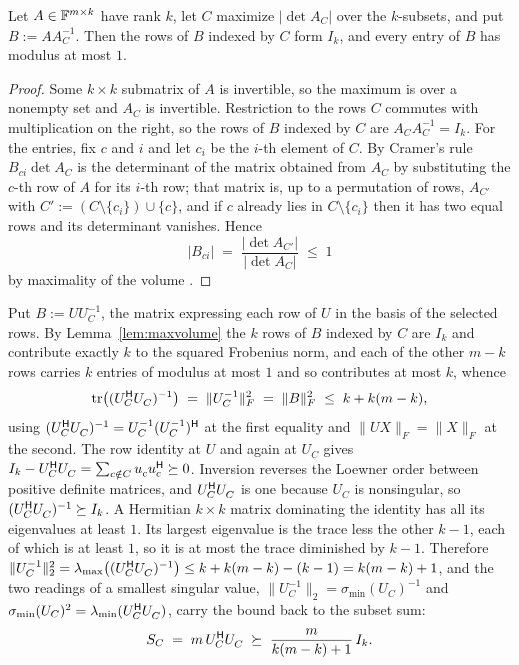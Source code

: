 \begin{lemma}\label{lem:maxvolume}
Let $A\in\mathbb{F}^{m\times k}$ have rank $k$, let $C$ maximize
$\lvert\det A_C\rvert$ over the $k$-subsets, and put $B:=AA_C^{-1}$.  Then
the rows of $B$ indexed by $C$ form $I_k$, and every entry of $B$ has
modulus at most $1$.
\end{lemma}

\begin{proof}
Some $k\times k$ submatrix of $A$ is invertible, so the maximum is over a
nonempty set and $A_C$ is invertible.  Restriction to the rows $C$
commutes with multiplication on the right, so the rows of $B$ indexed by
$C$ are $A_CA_C^{-1}=I_k$.  For the entries, fix $c$ and $i$ and let $c_i$
be the $i$-th element of $C$.  By Cramer's rule $B_{ci}\det A_C$ is the
determinant of the matrix obtained from $A_C$ by substituting the $c$-th
row of $A$ for its $i$-th row; that matrix is, up to a permutation of
rows, $A_{C'}$ with $C':=(C\setminus\{c_i\})\cup\{c\}$, and if $c$ already
lies in $C\setminus\{c_i\}$ then it has two equal rows and its determinant
vanishes.  Hence
\[
  \lvert B_{ci}\rvert
  \;=\;\frac{\lvert\det A_{C'}\rvert}{\lvert\det A_C\rvert}\;\le\;1
\]
by maximality of the volume \cite{GT2001}.
\end{proof}

Put $B:=UU_C^{-1}$, the matrix expressing each row of $U$ in the
basis of the selected rows.  By Lemma~\ref{lem:maxvolume} the $k$ rows of
$B$ indexed by $C$ are $I_k$ and contribute exactly $k$ to the squared
Frobenius norm, and each of the other $m-k$ rows carries $k$ entries of
modulus at most $1$ and so contributes at most $k$, whence
\[
  \tr\bigl((U_C\adj U_C^{\vphantom{\mathsf{H}}})^{-1}\bigr)
  \;=\;\lVert U_C^{-1}\rVert_F^2
  \;=\;\lVert B\rVert_F^2
  \;\le\;k+k(m-k),
\]
using $(U_C\adj U_C^{\vphantom{\mathsf{H}}})^{-1}=U_C^{-1}(U_C^{-1})\adj$ at
the first equality and $\lVert UX\rVert_F=\lVert X\rVert_F$ at the second.
The row identity at $U$ and again at $U_C$ gives
$I_k-U_C\adj U_C^{\vphantom{\mathsf{H}}}
=\sum_{c\notin C}u_c^{\vphantom{\mathsf{H}}}u_c\adj\psd0$.  Inversion
reverses the Loewner order between positive definite matrices, and
$U_C\adj U_C^{\vphantom{\mathsf{H}}}$ is one because $U_C$ is nonsingular,
so $(U_C\adj U_C^{\vphantom{\mathsf{H}}})^{-1}\psd I_k$.  A Hermitian
$k\times k$ matrix dominating the identity has all its eigenvalues at least
$1$.  Its largest eigenvalue is the trace less the other $k-1$, each of
which is at least $1$, so it is at most the trace diminished by $k-1$.
Therefore $\lVert U_C^{-1}\rVert_2^2
=\lmax\bigl((U_C\adj U_C^{\vphantom{\mathsf{H}}})^{-1}\bigr)
\le k+k(m-k)-(k-1)=k(m-k)+1$, and the two readings of a smallest singular
value, $\lVert U_C^{-1}\rVert_2=\sigma_{\min}(U_C)^{-1}$ and
$\sigma_{\min}(U_C)^2=\lmin(U_C\adj U_C^{\vphantom{\mathsf{H}}})$, carry
the bound back to the subset sum:
\[
  \SC\;=\;m\,U_C\adj U_C^{\vphantom{\mathsf{H}}}
  \;\psd\;\frac{m}{k(m-k)+1}\,I_k .
\]

